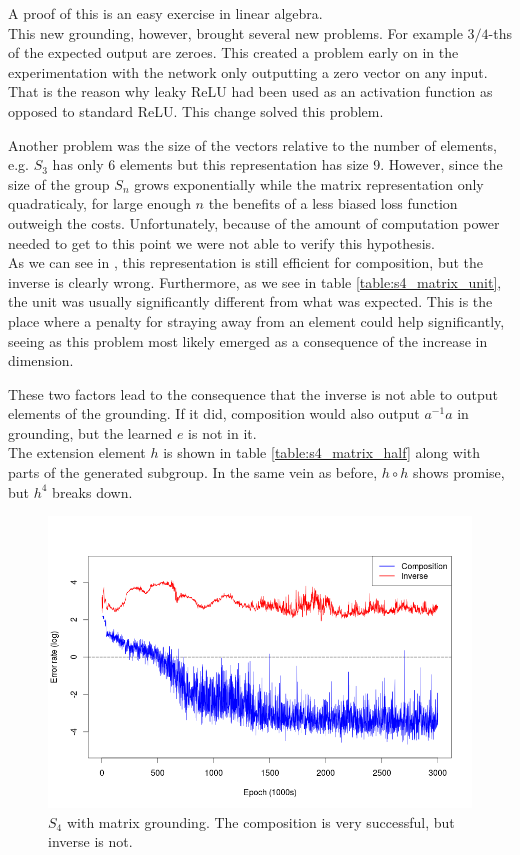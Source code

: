 A proof of this is an easy exercise in linear algebra. \\

This new grounding, however, brought several new problems. For example $3/4$-ths of the expected output are zeroes. This created a problem early on in the experimentation with the network only outputting a zero vector on any input. That is the reason why leaky ReLU had been used as an activation function as opposed to standard ReLU. This change solved this problem.

Another problem was the size of the vectors relative to the number of elements, e.g. $S_3$ has only 6 elements but this representation has size 9. However, since the size of the group $S_n$ grows exponentially while the matrix representation only quadraticaly, for large enough $n$ the benefits of a less biased loss function outweigh the costs. Unfortunately, because of the amount of computation power needed to get to this point we were not able to verify this hypothesis.\\

As we can see in , this representation is still  efficient for composition, but the inverse is clearly wrong. Furthermore, as we see in table \ref{table:s4_matrix_unit}, the unit was usually significantly different from what was expected. This is the place where a penalty for straying away from an element could help significantly, seeing as this problem most likely emerged as a consequence of the increase in dimension.

These two factors lead to the consequence that the inverse is not able to output elements of the grounding. If it did, composition would also output $a^{-1}a$ in grounding, but the learned $e$ is not in it.\\

The extension element $h$ is shown in table \ref{table:s4_matrix_half} along with parts of the generated subgroup. In the same vein as before, $h\circ h$ shows promise, but $h^4$ breaks down.

\begin{figure}
\center
\caption{$S_4$ with matrix grounding. The composition is very successful, but inverse is not.}
\label{graph:s4_matrix}
\includegraphics[width=\linewidth]{../img/s4_matrix.png}
\end{figure}

